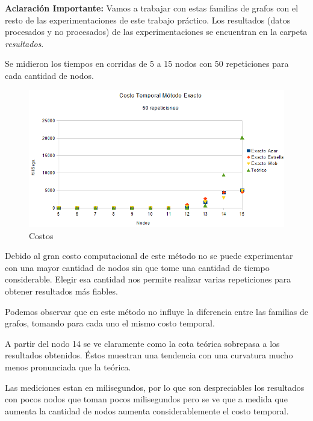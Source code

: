 \quad \textbf{Aclaración Importante:} Vamos a trabajar con estas familias de grafos con el resto de las experimentaciones de este trabajo práctico. Los resultados (datos procesados y no procesados) de las experimentaciones se encuentran en la carpeta \textit{resultados}.

\quad 

\quad Se midieron los tiempos en corridas de  5 a 15 nodos con 50 repeticiones para cada cantidad de nodos.

\begin{figure}[H]
	\centering
	\includegraphics[scale=0.8]{timingExacto.png}
\caption{Costos}
\end{figure}

\quad Debido al gran costo computacional de este método no se puede experimentar con una mayor cantidad de nodos sin que tome una cantidad de tiempo considerable. Elegir esa cantidad nos permite realizar varias repeticiones para obtener resultados más fiables.

\quad Podemos observar que en este método no influye la diferencia entre las familias de grafos, tomando para cada uno el mismo costo temporal. 

\quad A partir del nodo 14 se ve claramente como la cota teórica sobrepasa a los resultados obtenidos. Éstos muestran una tendencia con una curvatura mucho menos pronunciada que la teórica.

\quad Las mediciones estan en milisegundos, por lo que son despreciables los resultados con pocos nodos que toman pocos milisegundos pero se ve que a medida que aumenta la cantidad de nodos aumenta considerablemente el costo temporal.

